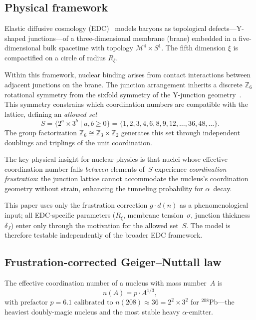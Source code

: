 \documentclass[aps,prc,twocolumn,showpacs,preprintnumbers,amsmath,amssymb]{revtex4-2}
\begin{document}
\subsection{Physical framework}
\label{sec:physical}

Elastic diffusive cosmology (EDC)~\cite{EDCPartI,EDCPaper2}
models baryons as topological defects---Y-shaped
junctions---of a three-dimensional membrane (brane) embedded in a
five-dimensional bulk spacetime with topology
$\mathcal{M}^4 \times S^1$.  The fifth dimension $\xi$ is
compactified on a circle of radius $R_\xi$.

Within this framework, nuclear binding arises from contact
interactions between adjacent junctions on the brane.  The
junction arrangement inherits a discrete $\mathbb{Z}_6$
rotational symmetry from the sixfold symmetry of the Y-junction
geometry~\cite{EDCBook4}.  This symmetry constrains which
coordination numbers are compatible with the lattice, defining
an \emph{allowed set}
\begin{equation}
  S = \{2^a \times 3^b \mid a, b \geq 0\}
    = \{1, 2, 3, 4, 6, 8, 9, 12, \ldots, 36, 48, \ldots\}.
  \label{eq:S}
\end{equation}
The group factorization
$\mathbb{Z}_6 \cong \mathbb{Z}_3 \times \mathbb{Z}_2$ generates
this set through independent doublings and triplings of the
unit coordination.

The key physical insight for nuclear physics is that nuclei
whose effective coordination number falls \emph{between} elements
of~$S$ experience \emph{coordination frustration}: the junction
lattice cannot accommodate the nucleus's coordination geometry
without strain, enhancing the tunneling probability for
$\alpha$~decay.

This paper uses only the frustration correction $g \cdot d(n)$
as a phenomenological input; all EDC-specific parameters
($R_\xi$, membrane tension~$\sigma$, junction thickness
$\delta_J$) enter only through the motivation for the allowed
set~$S$.  The model is therefore testable independently of the
broader EDC framework.

\subsection{Frustration-corrected Geiger--Nuttall law}
\label{sec:model}

The effective coordination number of a nucleus with mass
number~$A$ is
\begin{equation}
  n(A) = p \cdot A^{1/3},
  \label{eq:nA}
\end{equation}
with prefactor $p = 6.1$ calibrated to $n(208) \approx 36 =
2^2 \times 3^2$ for ${}^{208}$Pb---the heaviest doubly-magic
nucleus and the most stable heavy $\alpha$-emitter.
\end{document}
